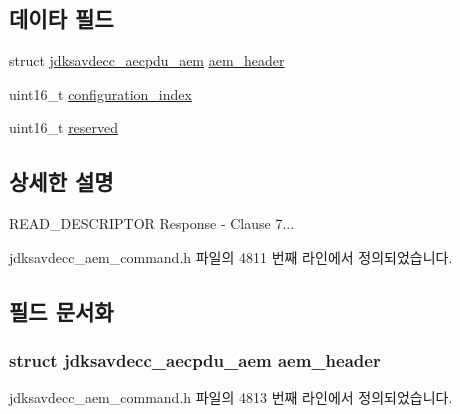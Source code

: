 \subsection*{데이타 필드}
\begin{DoxyCompactItemize}
\item 
struct \hyperlink{structjdksavdecc__aecpdu__aem}{jdksavdecc\+\_\+aecpdu\+\_\+aem} \hyperlink{structjdksavdecc__aem__command__read__descriptor__response_ae1e77ccb75ff5021ad923221eab38294}{aem\+\_\+header}
\item 
uint16\+\_\+t \hyperlink{structjdksavdecc__aem__command__read__descriptor__response_afaad1bd7c66f9611e134d8c5ce98f444}{configuration\+\_\+index}
\item 
uint16\+\_\+t \hyperlink{structjdksavdecc__aem__command__read__descriptor__response_a5a6ed8c04a3db86066924b1a1bf4dad3}{reserved}
\end{DoxyCompactItemize}


\subsection{상세한 설명}
R\+E\+A\+D\+\_\+\+D\+E\+S\+C\+R\+I\+P\+T\+OR Response -\/ Clause 7... 

jdksavdecc\+\_\+aem\+\_\+command.\+h 파일의 4811 번째 라인에서 정의되었습니다.



\subsection{필드 문서화}
\subsubsection[{\texorpdfstring{aem\+\_\+header}{aem_header}}]{\setlength{\rightskip}{0pt plus 5cm}struct {\bf jdksavdecc\+\_\+aecpdu\+\_\+aem} aem\+\_\+header}\hypertarget{structjdksavdecc__aem__command__read__descriptor__response_ae1e77ccb75ff5021ad923221eab38294}{}\label{structjdksavdecc__aem__command__read__descriptor__response_ae1e77ccb75ff5021ad923221eab38294}


jdksavdecc\+\_\+aem\+\_\+command.\+h 파일의 4813 번째 라인에서 정의되었습니다.

